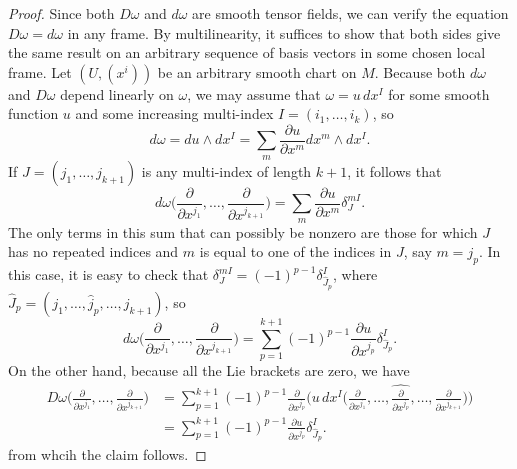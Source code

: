 \begin{proof}
Since both $D\omega$ and $d\omega$ are smooth tensor fields, we can verify the equation $D\omega=d\omega$ in any frame. By multilinearity, it suffices to show that both 
sides give the same result on an arbitrary sequence of basis vectors in some chosen local frame. Let $(U,(x^i))$ be an arbitrary smooth chart on $M$. Because both 
$d\omega$ and $D\omega$ depend linearly on $\omega$, we may assume that $\omega=u\,dx^I$ for some smooth function $u$ and some increasing multi-index 
$I=(i_1,\dots,i_k)$, so
\[d\omega=du\wedge dx^I=\sum_{m}\frac{\partial u}{\partial x^m}dx^m\wedge dx^I.\]
If $J=(j_1,\dots,j_{k+1})$ is any multi-index of length $k+1$, it follows that
\[d\omega\Big(\frac{\partial}{\partial x^{j_1}},\dots,\frac{\partial}{\partial x^{j_{k+1}}}\Big)=\sum_m\frac{\partial u}{\partial x^m}\delta^{mI}_{J}.\]
The only terms in this sum that can possibly be nonzero are those for which $J$ has no repeated indices and $m$ is equal to one of the indices in $J$, say $m=j_p$. In this case, it is easy to check that $\delta^{mI}_J=(-1)^{p-1}\delta^{I}_{\widehat{J}_p}$, where $\widehat{J}_p=(j_1,\dots,\widehat{j}_p,\dots,j_{k+1})$, so
\[d\omega\Big(\frac{\partial}{\partial x^{j_1}},\dots,\frac{\partial}{\partial x^{j_{k+1}}}\Big)=\sum_{p=1}^{k+1}(-1)^{p-1}\frac{\partial u}{\partial x^{j_p}}\delta^I_{\widehat{J}_p}.\]
On the other hand, because all the Lie brackets are zero, we have
\begin{align*}
D\omega\Big(\frac{\partial}{\partial x^{j_1}},\dots,\frac{\partial}{\partial x^{j_{k+1}}}\Big)&=\sum_{p=1}^{k+1}(-1)^{p-1}\frac{\partial}{\partial x^{j_p}}\Big(u\,dx^I\Big(\frac{\partial}{\partial x^{j_1}},\dots,\widehat{\frac{\partial}{\partial x^{j_p}}},\dots,\frac{\partial}{\partial x^{j_{k+1}}}\Big)\Big)\\
&=\sum_{p=1}^{k+1}(-1)^{p-1}\frac{\partial u}{\partial x^{j_p}}\delta^I_{\widehat{J}_p}.
\end{align*}
from whcih the claim follows.
\end{proof}
